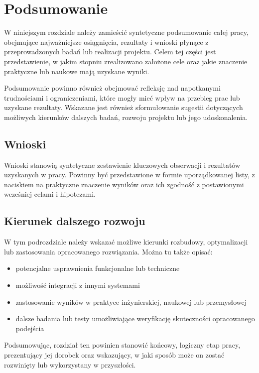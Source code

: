 \chapter{Podsumowanie}\label{chapter:4_Summary}
W niniejszym rozdziale należy zamieścić syntetyczne podsumowanie całej pracy, obejmujące najważniejsze osiągnięcia, rezultaty i wnioski płynące z przeprowadzonych badań lub realizacji projektu. Celem tej części jest przedstawienie, w jakim stopniu zrealizowano założone cele oraz jakie znaczenie praktyczne lub naukowe mają uzyskane wyniki.

Podsumowanie powinno również obejmować refleksję nad napotkanymi trudnościami i ograniczeniami, które mogły mieć wpływ na przebieg prac lub uzyskane rezultaty. Wskazane jest również sformułowanie sugestii dotyczących możliwych kierunków dalszych badań, rozwoju projektu lub jego udoskonalenia.

\section{Wnioski}
Wnioski stanowią syntetyczne zestawienie kluczowych obserwacji i rezultatów uzyskanych w pracy. Powinny być przedstawione w formie uporządkowanej listy, z naciskiem na praktyczne znaczenie wyników oraz ich zgodność z postawionymi wcześniej celami i hipotezami.

\section{Kierunek dalszego rozwoju}
\noindent W tym podrozdziale należy wskazać możliwe kierunki rozbudowy, optymalizacji lub zastosowania opracowanego rozwiązania. Można tu także opisać:
\begin{itemize}
    \item potencjalne usprawnienia funkcjonalne lub techniczne
    \item możliwość integracji z innymi systemami
    \item zastosowanie wyników w praktyce inżynierskiej, naukowej lub przemysłowej
    \item dalsze badania lub testy umożliwiające weryfikację skuteczności opracowanego podejścia
\end{itemize}

\noindent Podsumowując, rozdział ten powinien stanowić końcowy, logiczny etap pracy, prezentujący jej dorobek oraz wskazujący, w jaki sposób może on zostać rozwinięty lub wykorzystany w przyszłości.
